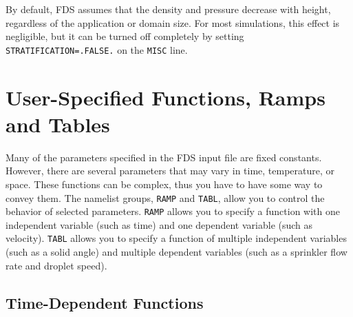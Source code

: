 \documentclass[11pt]{book}
\newcommand{\ct}{\tt\small}
\begin{document}
By default, FDS assumes that the density and pressure decrease with height, regardless of the
application or domain size. For most simulations, this effect is negligible, but it can be
turned off completely by setting {\ct STRATIFICATION=.FALSE.} on the {\ct MISC} line.






\chapter{User-Specified Functions, Ramps and Tables}
\label{info:RAMP}


Many of the parameters specified in the FDS input file are fixed constants. However, there are several parameters that may vary in
time, temperature, or space. These functions can be complex, thus you have to have some way to convey them. The namelist groups,
{\ct RAMP} and {\ct TABL}, allow you to control the behavior of selected parameters.  {\ct RAMP} allows you
to specify a function with one independent variable (such as time) and one dependent variable (such as velocity).
{\ct TABL} allows you to specify a function of multiple independent variables (such as a solid angle) and multiple
dependent variables (such as a sprinkler flow rate and droplet speed).



\section{Time-Dependent Functions}

\label{info:RAMP_Time}
\end{document}
